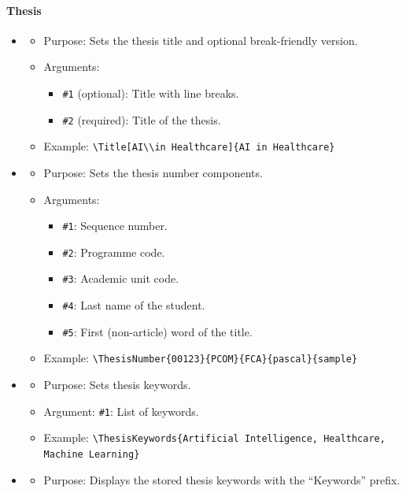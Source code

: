 \paragraph{Thesis}
\begin{itemize}[noitemsep]
\item {}
\begin{itemize}[noitemsep]
  \item \textsf{Purpose:} Sets the thesis title and optional break-friendly version.
  \item \textsf{Arguments:}
    \begin{itemize}
      \item \texttt{\#1} (optional): Title with line breaks.
      \item \texttt{\#2} (required): Title of the thesis.
    \end{itemize}
  \item \textsf{Example:} \verb|\Title[AI\\in Healthcare]{AI in Healthcare}|
\end{itemize}

\item {}
\begin{itemize}[noitemsep]
  \item \textsf{Purpose:} Sets the thesis number components.
  \item \textsf{Arguments:}
    \begin{itemize}
      \item \texttt{\#1}: Sequence number.
      \item \texttt{\#2}: Programme code.
      \item \texttt{\#3}: Academic unit code.
      \item \texttt{\#4}: Last name of the student.
      \item \texttt{\#5}: First (non-article) word of the title.
    \end{itemize}
  \item \textsf{Example:} \verb|\ThesisNumber{00123}{PCOM}{FCA}{pascal}{sample}|
\end{itemize}

\item {}
\begin{itemize}[noitemsep]
  \item \textsf{Purpose:} Sets thesis keywords.
  \item \textsf{Argument:} \texttt{\#1}: List of keywords.
  \item \textsf{Example:} \verb|\ThesisKeywords{Artificial Intelligence, Healthcare, Machine Learning}|
\end{itemize}

\item {}
\begin{itemize}[noitemsep]
  \item \textsf{Purpose:} Displays the stored thesis keywords with the ``Keywords'' prefix.
\end{itemize}
\end{itemize}

